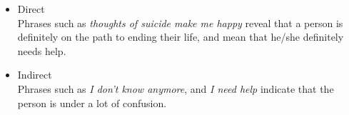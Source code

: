 \begin{itemize}
    \item{
    Direct\\
    Phrases such as \emph{thoughts of suicide make me happy} reveal that a person is definitely on the path to ending their life, and mean that he/she definitely needs help.
    }
    \item{
    Indirect\\
    Phrases such as \emph{I don't know anymore}, and \emph{I need help} indicate that the person is under a lot of confusion.
    }
\end{itemize}

